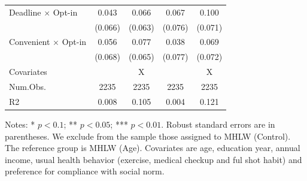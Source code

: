 \documentclass[
]{article}
\begin{document}
\begin{table}
\begin{threeparttable}
\begin{tabular}[t]{lcccc}
Deadline $\times$ Opt-in & \num{0.043} & \num{0.066} & \num{0.067} & \num{0.100}\\
 & (\num{0.066}) & (\num{0.063}) & (\num{0.076}) & (\num{0.071})\\
Convenient $\times$ Opt-in & \num{0.056} & \num{0.077} & \num{0.038} & \num{0.069}\\
 & (\num{0.068}) & (\num{0.065}) & (\num{0.077}) & (\num{0.072})\\
\midrule
Covariates &  & X &  & X\\
Num.Obs. & \num{2235} & \num{2235} & \num{2235} & \num{2235}\\
R2 & \num{0.008} & \num{0.105} & \num{0.004} & \num{0.121}\\
\bottomrule
\end{tabular}
\begin{tablenotes}
\item Notes: * $p < 0.1$; ** $p < 0.05$; *** $p < 0.01$. Robust standard errors are in parentheses. We exclude from the sample those assigned to MHLW (Control). The reference group is MHLW (Age). Covariates are age, education year, annual income, usual health behavior (exercise, medical checkup and ful shot habit) and preference for compliance with social norm.
\end{tablenotes}
\end{threeparttable}
\end{table}
\end{document}
